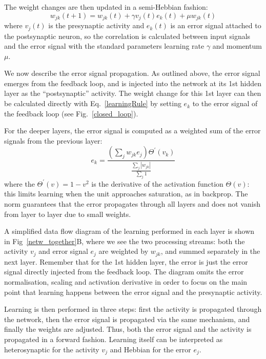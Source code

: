 \documentclass{aamas2018}
\begin{document}
The weight changes are then updated in a semi-Hebbian fashion:
\begin{equation}
  w_{jk}(t+1) = w_{jk}(t) + \gamma v_j(t)  e_k(t) + \mu w_{jk}(t) \label{learningRule}
\end{equation}
where $v_j(t)$ is the presynaptic activity and $e_k(t)$ is an error
signal attached to the postsynaptic neuron, so the correlation is
calculated between input signals and the error signal with the
standard parameters learning rate $\gamma$ and momentum $\mu$.

We now describe the error signal propagation. As outlined above, the
error signal emerges from the feedback loop, and is injected into the
network at its 1st hidden layer as the ``postsynaptic'' activity. The
weight change for this 1st layer can then be calculated directly with
Eq.~\ref{learningRule} by setting $e_k$ to the error signal of the
feedback loop (see Fig.~\ref{closed_loop}).

For the deeper layers, the error signal is computed as a weighted
sum of the error signals from the previous layer:
\begin{equation}
  e_k = \frac{\left( \sum_j w_{jk} e_{j} \right) \Theta^\prime (v_k) }{\frac{\sum_j {|w_{jk}|}}{\sum_j 1}}
  \label{deepError}
\end{equation}
where the $\Theta^\prime (v) = 1 - v^2$ is the derivative of the
activation function $\Theta(v)$: this limits learning when the unit
approaches saturation, as in backprop. The norm guarantees that
the error propagates through all layers and does not vanish from
layer to layer due to small weights.

A simplified data flow diagram of the learning performed in each layer
is shown in Fig~\ref{netw_together}B, where we see the two processing
streams: both the activity $v_j$ and error signal $e_j$ are weighted
by $w_{jk}$, and summed separately in the next layer. Remember that
for the 1st hidden layer, the error is just the error signal
directly injected from the feedback loop. The diagram omits the error
normalisation, scaling and activation derivative in order to focus on
the main point that learning happens between the error signal and the
presynaptic activity.

Learning is then performed in three steps: first the activity is
propagated through the network, then the error signal is propagated
via the same mechanism, and finally the weights are adjusted. Thus,
both the error signal and the activity is propagated in a forward
fashion. Learning itself can be interpreted as heterosynaptic for the
activity $v_j$ and Hebbian for the error $e_j$.
\end{document}
